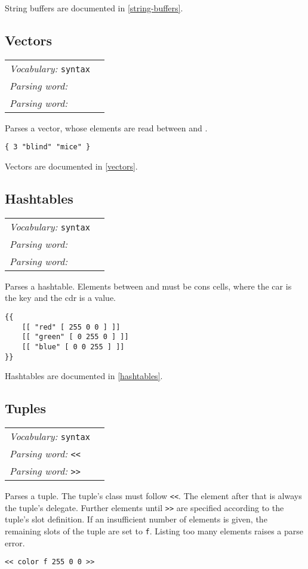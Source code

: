 \documentclass{book}
\newcommand{\tto}{\symbol{123}}
\newcommand{\ttc}{\symbol{125}}
\newcommand{\vocabulary}[1]{\emph{Vocabulary:} \texttt{#1}&\\}
\newcommand{\parsingword}[2]{\index{\texttt{#1}}\emph{Parsing word:} \texttt{#2}&\\}
\newcommand{\wordtable}[1]{


\begin{tabularx}{12cm}{lX}
\hline
#1
\hline
\end{tabularx}

}
\begin{document}
String buffers are documented in \ref{string-buffers}.

\subsection{Vectors}\label{vector-literals}
\newcommand{\vectorglos}{}
\vectorglos
\wordtable{
\vocabulary{syntax}
\parsingword{\tto}{\tto}
\parsingword{\ttc}{\ttc}
}
Parses a vector, whose elements are read between \texttt{\tto} and \texttt{\ttc}.
\begin{verbatim}
{ 3 "blind" "mice" }
\end{verbatim}

Vectors are documented in \ref{vectors}.

\subsection{Hashtables}
\newcommand{\hashglos}{}
\hashglos
\wordtable{
\vocabulary{syntax}
\parsingword{\tto\tto}{\tto\tto}
\parsingword{\ttc\ttc}{\ttc\ttc}
}
Parses a hashtable. Elements between \texttt{\tto\tto} and \texttt{\ttc\ttc} must be cons cells, where the car is the key and the cdr is a value.
\begin{verbatim}
{{
    [[ "red" [ 255 0 0 ] ]]
    [[ "green" [ 0 255 0 ] ]]
    [[ "blue" [ 0 0 255 ] ]]
}}
\end{verbatim}

Hashtables are documented in \ref{hashtables}.

\subsection{Tuples}
\newcommand{\tupleglos}{}
\tupleglos
\wordtable{
\vocabulary{syntax}
\parsingword{<<}{<<}
\parsingword{>>}{>>}
}
Parses a tuple. The tuple's class must follow \texttt{<<}. The element after that is always the tuple's delegate. Further elements until \texttt{>>} are specified according to the tuple's slot definition. If an insufficient number of elements is given, the remaining slots of the tuple are set to \verb|f|. Listing too many elements raises a parse error.
\begin{verbatim}
<< color f 255 0 0 >>
\end{verbatim}
\end{document}
